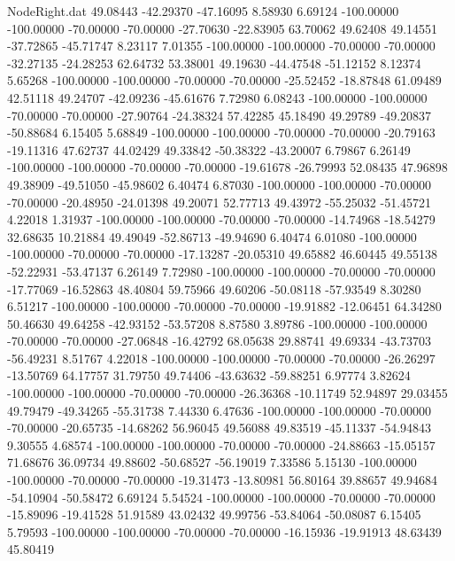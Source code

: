 \begin{filecontents}{NodeRight.dat}
  49.08443  -42.29370  -47.16095     8.58930    6.69124 -100.00000 -100.00000  -70.00000  -70.00000  -27.70630  -22.83905   63.70062   49.62408
  49.14551  -37.72865  -45.71747     8.23117    7.01355 -100.00000 -100.00000  -70.00000  -70.00000  -32.27135  -24.28253   62.64732   53.38001
  49.19630  -44.47548  -51.12152     8.12374    5.65268 -100.00000 -100.00000  -70.00000  -70.00000  -25.52452  -18.87848   61.09489   42.51118
  49.24707  -42.09236  -45.61676     7.72980    6.08243 -100.00000 -100.00000  -70.00000  -70.00000  -27.90764  -24.38324   57.42285   45.18490
  49.29789  -49.20837  -50.88684     6.15405    5.68849 -100.00000 -100.00000  -70.00000  -70.00000  -20.79163  -19.11316   47.62737   44.02429
  49.33842  -50.38322  -43.20007     6.79867    6.26149 -100.00000 -100.00000  -70.00000  -70.00000  -19.61678  -26.79993   52.08435   47.96898
  49.38909  -49.51050  -45.98602     6.40474    6.87030 -100.00000 -100.00000  -70.00000  -70.00000  -20.48950  -24.01398   49.20071   52.77713
  49.43972  -55.25032  -51.45721     4.22018    1.31937 -100.00000 -100.00000  -70.00000  -70.00000  -14.74968  -18.54279   32.68635   10.21884
  49.49049  -52.86713  -49.94690     6.40474    6.01080 -100.00000 -100.00000  -70.00000  -70.00000  -17.13287  -20.05310   49.65882   46.60445
  49.55138  -52.22931  -53.47137     6.26149    7.72980 -100.00000 -100.00000  -70.00000  -70.00000  -17.77069  -16.52863   48.40804   59.75966
  49.60206  -50.08118  -57.93549     8.30280    6.51217 -100.00000 -100.00000  -70.00000  -70.00000  -19.91882  -12.06451   64.34280   50.46630
  49.64258  -42.93152  -53.57208     8.87580    3.89786 -100.00000 -100.00000  -70.00000  -70.00000  -27.06848  -16.42792   68.05638   29.88741
  49.69334  -43.73703  -56.49231     8.51767    4.22018 -100.00000 -100.00000  -70.00000  -70.00000  -26.26297  -13.50769   64.17757   31.79750
  49.74406  -43.63632  -59.88251     6.97774    3.82624 -100.00000 -100.00000  -70.00000  -70.00000  -26.36368  -10.11749   52.94897   29.03455
  49.79479  -49.34265  -55.31738     7.44330    6.47636 -100.00000 -100.00000  -70.00000  -70.00000  -20.65735  -14.68262   56.96045   49.56088
  49.83519  -45.11337  -54.94843     9.30555    4.68574 -100.00000 -100.00000  -70.00000  -70.00000  -24.88663  -15.05157   71.68676   36.09734
  49.88602  -50.68527  -56.19019     7.33586    5.15130 -100.00000 -100.00000  -70.00000  -70.00000  -19.31473  -13.80981   56.80164   39.88657
  49.94684  -54.10904  -50.58472     6.69124    5.54524 -100.00000 -100.00000  -70.00000  -70.00000  -15.89096  -19.41528   51.91589   43.02432
  49.99756  -53.84064  -50.08087     6.15405    5.79593 -100.00000 -100.00000  -70.00000  -70.00000  -16.15936  -19.91913   48.63439   45.80419

\end{filecontents}
